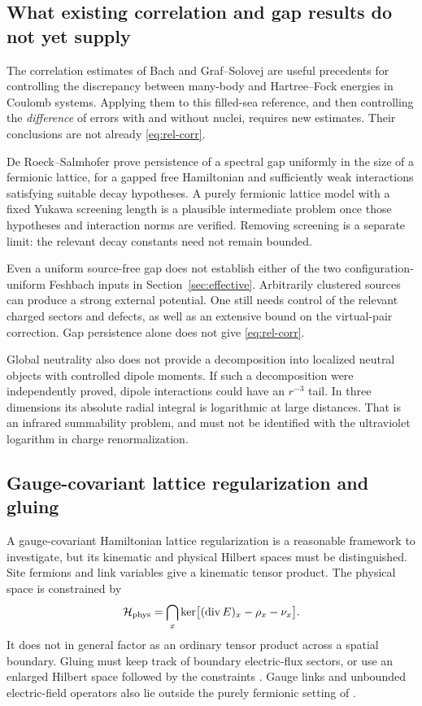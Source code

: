 \subsection{What existing correlation and gap results do not yet supply}
The correlation estimates of Bach and Graf--Solovej
\cite{Bach1992,GS1994} are useful precedents for controlling the discrepancy
between many-body and Hartree--Fock energies in Coulomb systems.
Applying them to this filled-sea reference, and then controlling the
\emph{difference} of errors with and without nuclei, requires new estimates.
Their conclusions are not already \eqref{eq:rel-corr}.

De Roeck--Salmhofer \cite{DRS2019} prove persistence of a spectral gap
uniformly in the size of a fermionic lattice, for a gapped free Hamiltonian
and sufficiently weak interactions satisfying suitable decay hypotheses.
A purely fermionic lattice model with a fixed Yukawa screening length is
a plausible intermediate problem once those hypotheses and interaction
norms are verified. Removing screening is a separate limit: the relevant
decay constants need not remain bounded.

Even a uniform source-free gap does not establish either of the two
configuration-uniform Feshbach inputs in Section~\ref{sec:effective}.
Arbitrarily clustered sources can produce a strong external potential.
One still needs control of the relevant charged sectors and defects,
as well as an extensive bound on the virtual-pair correction.
Gap persistence alone does not give \eqref{eq:rel-corr}.

Global neutrality also does not provide a decomposition into localized
neutral objects with controlled dipole moments. If such a decomposition
were independently proved, dipole interactions could have an \(r^{-3}\)
tail. In three dimensions its absolute radial integral is logarithmic at
large distances. That is an infrared summability problem, and must not
be identified with the ultraviolet logarithm in charge renormalization.

\subsection{Gauge-covariant lattice regularization and gluing}
A gauge-covariant Hamiltonian lattice regularization is a reasonable
framework to investigate, but its kinematic and physical Hilbert spaces
must be distinguished. Site fermions and link variables give a kinematic
tensor product. The physical space is constrained by
\begin{equation}
\mathcal H_{\rm phys}
=\bigcap_x\ker\bigl[(\operatorname{div}E)_x-\rho_x-\nu_x\bigr].
\end{equation}
It does not in general factor as an ordinary tensor product across a
spatial boundary. Gluing must keep track of boundary electric-flux
sectors, or use an enlarged Hilbert space followed by the constraints
\cite{KS1975,Donnelly2014}. Gauge links and unbounded electric-field
operators also lie outside the purely fermionic setting of
\cite{DRS2019}.

